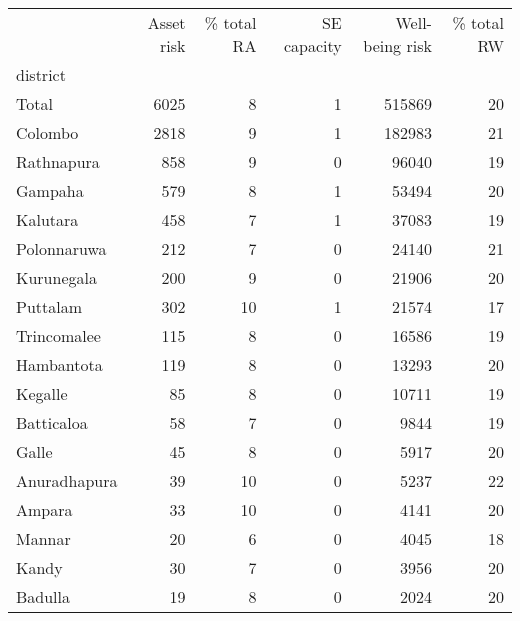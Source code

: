 \begin{tabular}{lrrrrr}
\toprule
{} &  Asset risk &  \% total RA &  SE capacity &  Well-being risk &  \% total RW \\
district     &             &             &              &                  &             \\
\midrule
Total        &        6025 &           8 &            1 &           515869 &          20 \\
Colombo      &        2818 &           9 &            1 &           182983 &          21 \\
Rathnapura   &         858 &           9 &            0 &            96040 &          19 \\
Gampaha      &         579 &           8 &            1 &            53494 &          20 \\
Kalutara     &         458 &           7 &            1 &            37083 &          19 \\
Polonnaruwa  &         212 &           7 &            0 &            24140 &          21 \\
Kurunegala   &         200 &           9 &            0 &            21906 &          20 \\
Puttalam     &         302 &          10 &            1 &            21574 &          17 \\
Trincomalee  &         115 &           8 &            0 &            16586 &          19 \\
Hambantota   &         119 &           8 &            0 &            13293 &          20 \\
Kegalle      &          85 &           8 &            0 &            10711 &          19 \\
Batticaloa   &          58 &           7 &            0 &             9844 &          19 \\
Galle        &          45 &           8 &            0 &             5917 &          20 \\
Anuradhapura &          39 &          10 &            0 &             5237 &          22 \\
Ampara       &          33 &          10 &            0 &             4141 &          20 \\
Mannar       &          20 &           6 &            0 &             4045 &          18 \\
Kandy        &          30 &           7 &            0 &             3956 &          20 \\
Badulla      &          19 &           8 &            0 &             2024 &          20 \\

\end{tabular}

